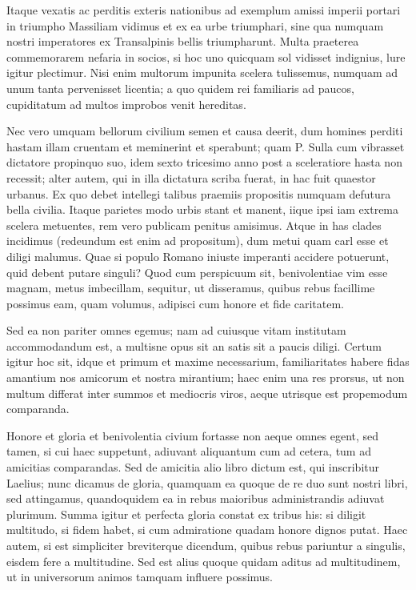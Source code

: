  Itaque vexatis ac perditis exteris nationibus ad exemplum amissi imperii portari in triumpho Massiliam vidimus et ex ea urbe triumphari, sine qua numquam nostri imperatores ex Transalpinis bellis triumpharunt. Multa praeterea commemorarem nefaria in socios, si hoc uno quicquam sol vidisset indignius, lure igitur plectimur. Nisi enim multorum impunita scelera tulissemus, numquam ad unum tanta pervenisset licentia; a quo quidem rei familiaris ad paucos, cupiditatum ad multos improbos venit hereditas.

 Nec vero umquam bellorum civilium semen et causa deerit, dum homines perditi hastam illam cruentam et meminerint et sperabunt; quam P. Sulla cum vibrasset dictatore propinquo suo, idem sexto tricesimo anno post a sceleratiore hasta non recessit; alter autem, qui in illa dictatura scriba fuerat, in hac fuit quaestor urbanus. Ex quo debet intellegi talibus praemiis propositis numquam defutura bella civilia. Itaque parietes modo urbis stant et manent, iique ipsi iam extrema scelera metuentes, rem vero publicam penitus amisimus. Atque in has clades incidimus (redeundum est enim ad propositum), dum metui quam carl esse et diligi malumus. Quae si populo Romano iniuste imperanti accidere potuerunt, quid debent putare singuli? Quod cum perspicuum sit, benivolentiae vim esse magnam, metus imbecillam, sequitur, ut disseramus, quibus rebus facillime possimus eam, quam volumus, adipisci cum honore et fide caritatem.

 Sed ea non pariter omnes egemus; nam ad cuiusque vitam institutam accommodandum est, a multisne opus sit an satis sit a paucis diligi. Certum igitur hoc sit, idque et primum et maxime necessarium, familiaritates habere fidas amantium nos amicorum et nostra mirantium; haec enim una res prorsus, ut non multum differat inter summos et mediocris viros, aeque utrisque est propemodum comparanda.

 Honore et gloria et benivolentia civium fortasse non aeque omnes egent, sed tamen, si cui haec suppetunt, adiuvant aliquantum cum ad cetera, tum ad amicitias comparandas. Sed de amicitia alio libro dictum est, qui inscribitur Laelius; nunc dicamus de gloria, quamquam ea quoque de re duo sunt nostri libri, sed attingamus, quandoquidem ea in rebus maioribus administrandis adiuvat plurimum. Summa igitur et perfecta gloria constat ex tribus his: si diligit multitudo, si fidem habet, si cum admiratione quadam honore dignos putat. Haec autem, si est simpliciter breviterque dicendum, quibus rebus pariuntur a singulis, eisdem fere a multitudine. Sed est alius quoque quidam aditus ad multitudinem, ut in universorum animos tamquam influere possimus.

